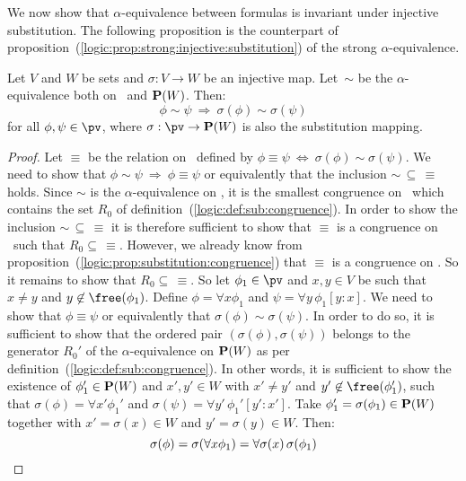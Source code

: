 We now show that $\alpha$-equivalence between formulas is invariant under
injective substitution. The following proposition is the counterpart
of proposition~(\ref{logic:prop:strong:injective:substitution}) of
the strong $\alpha$-equivalence.

\begin{prop}\label{logic:prop:sub:congruence:injective:substitution}
Let $V$ and $W$ be sets and $\sigma:V\to W$ be an injective map.
Let~$\sim$ be the $\alpha$-equivalence both on \pv\ and ${\bf
P}(W)$. Then:
    \[
    \phi\sim\psi\ \Rightarrow\ \sigma(\phi)\sim\sigma(\psi)
    \]
for all $\phi,\psi\in\pv$, where $\sigma:\pv\to{\bf P}(W)$ is also
the substitution mapping.
\end{prop}

\noindent
\begin{proof}
Let $\equiv$ be the relation on \pv\ defined by $\phi\equiv\psi\
\Leftrightarrow\ \sigma(\phi)\sim\sigma(\psi)$. We need to show that
$\phi\sim\psi\ \Rightarrow\ \phi\equiv\psi$ or equivalently that the
inclusion $\sim\,\subseteq\,\equiv$ holds. Since $\sim$ is the 
$\alpha$-equivalence on \pv, it is the smallest congruence on
\pv\ which contains the set $R_{0}$ of
definition~(\ref{logic:def:sub:congruence}). In order to show the
inclusion $\sim\,\subseteq\,\equiv$ it is therefore sufficient to
show that $\equiv$ is a congruence on \pv\ such that
$R_{0}\subseteq\,\equiv$. However, we already know from
proposition~(\ref{logic:prop:substitution:congruence}) that $\equiv$
is a congruence on \pv. So it remains to show that
$R_{0}\subseteq\,\equiv$. So let $\phi_{1}\in\pv$ and $x,y\in V$ be
such that $x\neq y$ and $y\not\in\free(\phi_{1})$. Define
$\phi=\forall x\phi_{1}$ and $\psi=\forall y\,\phi_{1}[y\!:\!x]$. We
need to show that $\phi\equiv\psi$ or equivalently that
$\sigma(\phi)\sim\sigma(\psi)$. In order to do so, it is sufficient
to show that the ordered pair $(\sigma(\phi),\sigma(\psi))$ belongs
to the generator $R_{0}'$ of the $\alpha$-equivalence on ${\bf
P}(W)$ as per definition~(\ref{logic:def:sub:congruence}). In other
words, it is sufficient to show the existence of $\phi_{1}'\in{\bf
P}(W)$ and $x',y'\in W$ with $x'\neq y'$ and
$y'\not\in\free(\phi_{1}')$, such that $\sigma(\phi)=\forall
x'\phi_{1}'$ and $\sigma(\psi)=\forall y'\,\phi_{1}'[y'\!:\!x']$.
Take $\phi_{1}'=\sigma(\phi_{1})\in{\bf P}(W)$ together with
$x'=\sigma(x)\in W$ and $y'=\sigma(y)\in W$. Then:
    \[
    \sigma(\phi)=\sigma(\forall x\phi_{1})\\
        =\forall\sigma(x)\,\sigma(\phi_{1})\\
\]
\end{proof}
